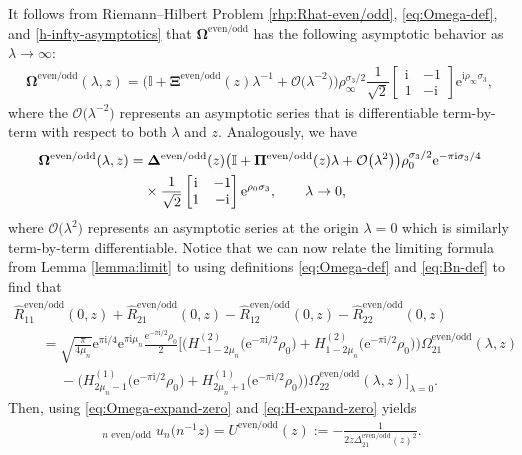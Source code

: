 \documentclass[11pt]{article}
\numberwithin{equation}{section}
\numberwithin{equation}{section}
\newcommand{\ee}{\mathrm{e}}
\newcommand{\ii}{\mathrm{i}}
\begin{document}
It follows from Riemann--Hilbert Problem \ref{rhp:Rhat-even/odd}, \eqref{eq:Omega-def}, and \eqref{h-infty-asymptotics} that $\mathbf{\Omega}^\mathrm{even/odd}$ has the following asymptotic behavior as $\lambda \to \infty$:
\begin{align}
\mathbf{\Omega}^\mathrm{even/odd}(\lambda, z) = \big( \mathbb{I} + \mathbf{\Xi^{\mathrm{even/odd}}}(z) \lambda^{-1} + \mathcal{O}\big(\lambda^{-2}\big) \big) \rho_\infty^{\sigma_3/2} {\dfrac{1}{\sqrt{2}}} \begin{bmatrix} \ii & -1\\ 1 &-\ii \end{bmatrix} \ee^{\ii \rho_\infty \sigma_3},
 \label{eq:Omega-expand-infty}
\end{align}
where the $\mathcal{O}\big(\lambda^{-2}\big)$ represents an asymptotic series that is differentiable term-by-term with respect to both $\lambda$ and $z$. Analogously, we have
\begin{align}
 &\mathbf{\Omega}^{\mathrm{even/odd}}(\lambda,z)= \mathbf{\Delta}^\mathrm{even/odd}(z)\big(\mathbb{I}+\mathbf{\Pi}^\mathrm{even/odd}(z)\lambda+\mathcal{O}\big(\lambda^2\big)\big)\rho_0^{\sigma_3/2}\ee^{-\pi \ii \sigma_3/4} \nonumber\\
 &\hphantom{\mathbf{\Omega}^{\mathrm{even/odd}}(\lambda,z)=}{}
 \times{\dfrac{1}{\sqrt{2}}} {}{} \begin{bmatrix} \ii & -1 \\ 1 &-\ii \end{bmatrix} \ee^{ \rho_0 \sigma_3}, \qquad \lambda\to 0,
 \label{eq:Omega-expand-zero}
\end{align}
where $\mathcal{O}\big(\lambda^2\big)$ represents an asymptotic series at the origin $\lambda=0$ which is similarly term-by-term differentiable.
Notice that we can now relate the limiting formula from Lemma \ref{lemma:limit} to  using definitions \eqref{eq:Omega-def} and \eqref{eq:Bn-def} to find that
\begin{gather*}
 \hat{R}^\mathrm{even/odd}_{11}(0,z)+\hat{R}^\mathrm{even/odd}_{21}(0,z)-\hat{R}^\mathrm{even/odd}_{12}(0,z)-\hat{R}^\mathrm{even/odd}_{22}(0,z)\\
 \qquad =\sqrt{\frac{\pi}{4\mu_n}} \ee^{\pi \ii/4} \ee^{\pi \ii \mu_n} \frac{\ee^{-\pi \ii/2}\rho_0}{2} \big[ \big(H^{(2)}_{-1-2\mu_n}\big(\ee^{-\pi \ii/2}\rho_0\big) + H^{(2)}_{1-2\mu_n}\big(\ee^{-\pi \ii/2}\rho_0\big)\big)\Omega^{\mathrm{even/odd}}_{21}(\lambda, z) \\
 \phantom{\qquad =}{}- \big(H^{(1)}_{2\mu_n-1}\big(\ee^{-\pi \ii/2}\rho_0\big) + H^{(1)}_{2\mu_n +1}\big(\ee^{-\pi \ii/2}\rho_0\big)\big)\Omega^{\mathrm{even/odd}}_{22}(\lambda, z) \big]_{\lambda=0}.
\end{gather*}
Then, using \eqref{eq:Omega-expand-zero} and \eqref{eq:H-expand-zero} yields
\begin{gather*}
 \mathop{\lim_{n\to\infty}}_{\text{$n$ even/odd}}u_n\big(n^{-1}z\big)=U^\mathrm{even/odd}(z):=-\frac{1}{2z\Delta^\mathrm{even/odd}_{21}(z)^2}.
\end{gather*}
\end{document}
